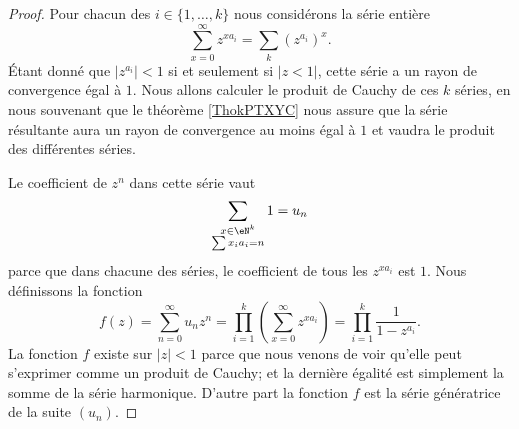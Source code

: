 \begin{proof}
    Pour chacun des \( i\in\{ 1,\ldots, k \}\) nous considérons la série entière
    \begin{equation}
        \sum_{x=0}^{\infty}z^{xa_i}=\sum_k(z^{a_i})^x.
    \end{equation}
    Étant donné que \( | z^{a_i} |<1\) si et seulement si \( | z<1 |\), cette série a un rayon de convergence égal à \( 1\). Nous allons calculer le produit de Cauchy de ces \( k\) séries, en nous souvenant que le théorème \ref{ThokPTXYC} nous assure que la série résultante aura un rayon de convergence au moins égal à \( 1\) et vaudra le produit des différentes séries.

    Le coefficient de \( z^n\) dans cette série vaut
    \begin{equation}
        \sum_{\substack{x\in \eN^k\\\sum x_ia_i=n}}1=u_n 
    \end{equation}
    parce que dans chacune des séries, le coefficient de tous les \( z^{xa_i}\) est \( 1\). Nous définissons la fonction
    \begin{equation}    \label{EqKTRNFSl}
        f(z)=\sum_{n=0}^{\infty}u_nz^n=\prod_{i=1}^k\left( \sum_{x=0}^{\infty}z^{xa_i} \right)=\prod_{i=1}^k\frac{1}{ 1-z^{a_i} }.
    \end{equation}
    La fonction \( f\) existe sur \( | z |<1\) parce que nous venons de voir qu'elle peut  s'exprimer comme un produit de Cauchy; et la dernière égalité est simplement la somme de la série harmonique. D'autre part la fonction \( f\) est la série génératrice de la suite \( (u_n)\).


\end{proof}
